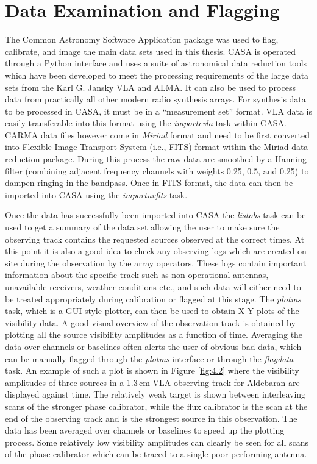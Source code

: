 \section{Data Examination and Flagging}\label{sec:4.1}
The Common Astronomy Software Application \citep[CASA;][]{mcmullin_2007} package was used to flag, calibrate, and image the main data sets used in this thesis. CASA is operated through a Python interface and uses a suite of astronomical data reduction tools which have been developed to meet the processing requirements of the large  data sets from the Karl G. Jansky VLA and ALMA. It can also be used to process data from practically all other modern radio synthesis arrays. For synthesis data to be processed in CASA, it must be in a ``measurement set'' format. VLA data is easily transferable into this format using the \textit{importevla} task within CASA. CARMA data files however come in \textit{Miriad} format and need to be first converted into Flexible Image Transport System (i.e., FITS) format within the Miriad \citep{sault_1995} data reduction package. During this process the raw data are smoothed by a Hanning filter (combining adjacent frequency channels with weights 0.25, 0.5, and 0.25) to dampen ringing in the bandpass. Once in FITS format, the data can then be imported into CASA using the \textit{importuvfits} task.

Once the data has successfully been imported into CASA the \textit{listobs} task can be used to get a summary of the data set allowing the user to make sure the observing track contains the requested sources observed at the correct times. At this point it is also a good idea to check any observing logs which are created on site during the observation by the array operators. These logs contain important information about the specific track such as non-operational antennas, unavailable receivers, weather conditions etc., and such data will either need to be treated appropriately during calibration or flagged at this stage. The \textit{plotms} task, which is a GUI-style plotter, can then be used to obtain X-Y plots of the visibility data. A good visual overview of the observation track is obtained by plotting all the source visibility amplitudes as a function of time. Averaging the data over channels or baselines often alerts the user of obvious bad data, which can be manually flagged through the \textit{plotms} interface or through the \textit{flagdata} task. An example of such a plot is shown in Figure \ref{fig:4.2} where the visibility amplitudes of three sources in a 1.3\,cm VLA observing track for Aldebaran are displayed against time. The relatively weak target is shown between interleaving scans of the stronger phase calibrator, while the flux calibrator is the scan at the end of the observing track and is the strongest source in this observation. The data has been averaged over channels or baselines to speed up the plotting process. Some relatively low visibility amplitudes can clearly be seen for all scans of the phase calibrator which can be traced to a single poor performing antenna.

